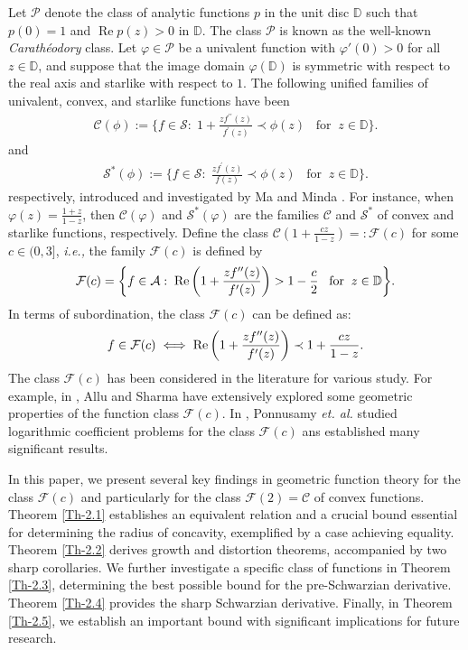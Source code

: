 \documentclass[a4paper,12pt]{amsart}
\theoremstyle{plain}
\theoremstyle{definition}
\theoremstyle{plain}
\newcounter {own}
\begin{document}
Let $\mathcal{P}$ denote the class of analytic functions $p$ in the unit disc $\mathbb{D}$ such that $p(0) = 1$ and $\operatorname{Re} p(z) > 0$ in $\mathbb{D}$. The class $\mathcal{P}$ is known as the well-known \textit{Carathéodory} class. Let $\varphi \in \mathcal{P}$ be a univalent function with $\varphi'(0) > 0$ for all $z \in \mathbb{D}$, and suppose that the image domain $\varphi(\mathbb{D})$ is symmetric with respect to the real axis and starlike with respect to $1$. The following unified families of univalent, convex, and starlike functions have been
\begin{align*}
	\mathcal{C}(\phi):=\bigg\{f\in\mathcal{S}:\;1+\frac{zf^{\prime\prime}(z)}{f^{\prime}(z)}\prec\phi(z)\;\;\;\mbox{for}\;\;z\in\mathbb{D}\bigg\}.
\end{align*}
and
\begin{align*}
	\mathcal{S^*}(\phi):=\bigg\{f\in\mathcal{S}:\;\frac{zf^{\prime}(z)}{f(z)}\prec\phi(z)\;\;\;\mbox{for}\;\;z\in\mathbb{D}\bigg\}.
\end{align*}
respectively, introduced and investigated by Ma and Minda \cite{Ma-Minda-1992}. For instance, when $\varphi(z) = \frac{1 + z}{1 - z}$, then $\mathcal{C}(\varphi)$ and $\mathcal{S}^*(\varphi)$ are the families $\mathcal{C}$ and $\mathcal{S}^*$ of convex and starlike functions, respectively. Define the class     $\mathcal{C}\left(1+\frac{cz}{1-z}\right)=:\mathcal{F}(c)$ for some $c\in(0,3]$, \emph{i.e.,} the family $\mathcal{F}(c)$ is defined by
\begin{align*}
	\mathcal{F}(c)=\bigg\{f\in\mathcal{A}:\;{\rm Re}\left(1+\frac{zf^{\prime\prime}(z)}{f^{\prime}(z)}\right)>1-\frac{c}{2}\;\;\;\mbox{for}\;\;z\in\mathbb{D}\bigg\}.
\end{align*}
In terms of subordination, the class $\mathcal{F}(c)$ can be defined as:
\begin{align}\label{Eq-1.5}
	f\in\mathcal{F}(c)\iff{\rm Re  }\left(1+\frac{zf^{\prime\prime}(z)}{f^{\prime}(z)}\right)\prec1+\frac{cz}{1-z}.
\end{align}
The class $\mathcal{F}(c)$ has been considered in the literature for various study. For example, in \cite{Allu-Sharma-BDS-2024}, Allu and Sharma have extensively explored some geometric properties of the function class $\mathcal{F}(c)$. In \cite{Pon-Sha-Wirth-JAMS-2020}, Ponnusamy \emph{et. al.} studied logarithmic coefficient problems for the class $\mathcal{F}(c)$ ans established many significant results. \vspace{2mm}
 
 In this paper, we present several key findings in geometric function theory for the class $\mathcal{F}(c)$ and particularly for the class $\mathcal{F}(2)=\mathcal{C}$ of convex functions. Theorem \ref{Th-2.1} establishes an equivalent relation and a crucial bound essential for determining the radius of concavity, exemplified by a case achieving equality. Theorem \ref{Th-2.2} derives growth and distortion theorems, accompanied by two sharp corollaries. We further investigate a specific class of functions in Theorem \ref{Th-2.3}, determining the best possible bound for the pre-Schwarzian derivative. Theorem \ref{Th-2.4} provides the sharp Schwarzian derivative. Finally, in Theorem \ref{Th-2.5}, we establish an important bound with significant implications for future research.
\end{document}
